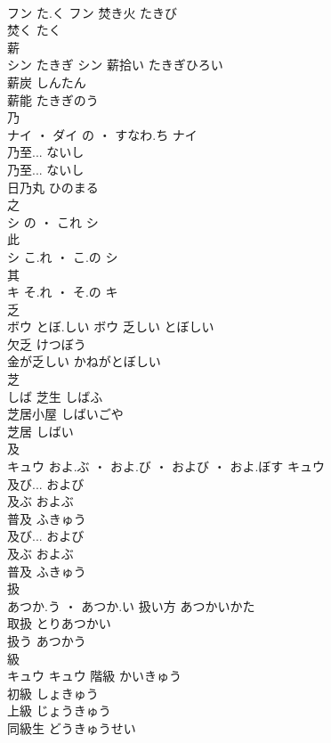 \documentclass[8pt]{extreport}
\begin{document}
\begin{CJK}{UTF8}{min}
\\	フン	た.く	フン	焚き火	たきび	
\\	焚く	たく	
\\	薪	
\\	シン	たきぎ	シン	薪拾い	たきぎひろい	
\\	薪炭	しんたん	
\\	薪能	たきぎのう	
\\	乃	
\\	ナイ ・ ダイ	の ・ すなわ.ち	ナイ	
\\	乃至...	ないし	
\\	乃至...	ないし	
\\	日乃丸	ひのまる	
\\	之	
\\	シ	の ・ これ	シ																																			
\\	此	
\\	シ	こ.れ ・ こ.の	シ																																			
\\	其	
\\	キ	そ.れ ・ そ.の	キ																																			
\\	乏	
\\	ボウ	とぼ.しい	ボウ	乏しい	とぼしい	
\\	欠乏	けつぼう	
\\	金が乏しい	かねがとぼしい	
\\	芝	
\\	しば		芝生	しばふ	
\\	芝居小屋	しばいごや	
\\	芝居	しばい	
\\	及	
\\	キュウ	およ.ぶ ・ およ.び ・ および ・ およ.ぼす	キュウ	
\\	及び...	および	
\\	及ぶ	およぶ	
\\	普及	ふきゅう	
\\	及び...	および	
\\	及ぶ	およぶ	
\\	普及	ふきゅう	
\\	扱	
\\	あつか.う ・ あつか.い		扱い方	あつかいかた	
\\	取扱	とりあつかい	
\\	扱う	あつかう	
\\	級	
\\	キュウ		キュウ	階級	かいきゅう	
\\	初級	しょきゅう	
\\	上級	じょうきゅう	
\\	同級生	どうきゅうせい	

\end{CJK}
\end{document}
